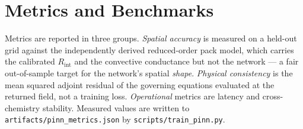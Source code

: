 \documentclass[journal,10pt,compsoc,onecolumn]{IEEEtran}
\begin{document}
\section{Metrics and Benchmarks}
\label{sec:benchmarks}

\noindent
Metrics are reported in three groups. \emph{Spatial accuracy} is measured on a
held-out grid against the independently derived reduced-order pack model, which
carries the calibrated $R_{\mathrm{int}}$ and the convective conductance but not
the network --- a fair out-of-sample target for the network's spatial
\emph{shape}. \emph{Physical consistency} is the mean squared adjoint residual
of the governing equations evaluated at the returned field, not a training
loss. \emph{Operational} metrics are latency and cross-chemistry stability.
Measured values are written to \texttt{artifacts/pinn\_metrics.json} by
\texttt{scripts/train\_pinn.py}.
\end{document}
